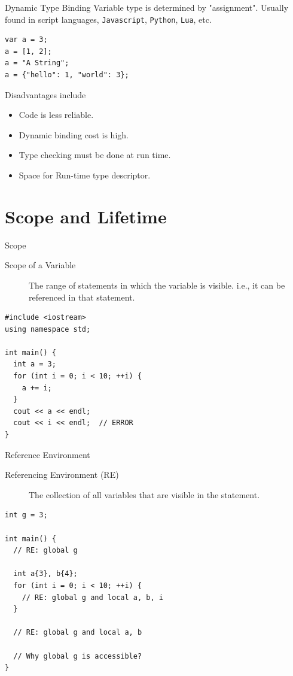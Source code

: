 \documentclass[presentation]{beamer}
\begin{document}
\begin{frame}[fragile,label={sec:orgheadline20}]{Dynamic Type Binding}
 Variable type is determined by "assignment".  Usually found in
script languages, \texttt{Javascript}, \texttt{Python}, \texttt{Lua}, etc.

\begin{verbatim}
var a = 3;
a = [1, 2];
a = "A String";
a = {"hello": 1, "world": 3};
\end{verbatim}

Disadvantages include
\begin{itemize}
\item Code is less reliable.
\item Dynamic binding cost is high.
\item Type checking must be done at run time.
\item Space for Run-time type descriptor.
\end{itemize}
\end{frame}

\section{Scope and Lifetime}
\label{sec:orgheadline41}

\begin{frame}[fragile,label={sec:orgheadline22}]{Scope}
 \begin{description}
\item[{Scope of a Variable}] The range of statements in which the
variable is visible. i.e., it can be referenced in that
statement.
\end{description}


\begin{verbatim}
#include <iostream>
using namespace std;

int main() {
  int a = 3;
  for (int i = 0; i < 10; ++i) {
    a += i;
  }
  cout << a << endl;
  cout << i << endl;  // ERROR
}
\end{verbatim}
\end{frame}

\begin{frame}[fragile,label={sec:orgheadline23}]{Reference Environment}
 \begin{description}
\item[{Referencing Environment (RE)}] The collection of all variables
that are visible in the statement.
\end{description}


\begin{verbatim}
int g = 3;

int main() {
  // RE: global g

  int a{3}, b{4};
  for (int i = 0; i < 10; ++i) {
    // RE: global g and local a, b, i
  }

  // RE: global g and local a, b

  // Why global g is accessible?
}
\end{verbatim}
\end{frame}
\end{document}
